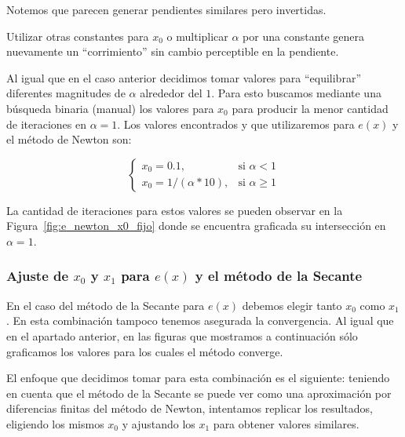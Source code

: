 Notemos que parecen generar pendientes similares pero invertidas.

Utilizar otras constantes para $x_0$ o multiplicar $\alpha$ por una constante
genera nuevamente un ``corrimiento'' sin cambio perceptible en la pendiente.

Al igual que en el caso anterior decidimos tomar valores para ``equilibrar''
diferentes magnitudes de $\alpha$ alrededor del $1$. Para esto buscamos
mediante una búsqueda binaria (manual) los valores para $x_0$ para producir la
menor cantidad de iteraciones en $\alpha = 1$. Los valores encontrados y que
utilizaremos para $e(x)$ y el método de Newton son:

\[
\begin{cases}
x_0 = 0.1, & \mbox{si } \alpha < 1\\
x_0 = 1 / (\alpha * 10), & \mbox{si } \alpha \ge 1
\end{cases}
\]

La cantidad de iteraciones para estos valores se pueden observar en la
Figura~\ref{fig:e_newton_x0_fijo} donde se encuentra graficada su intersección
en $\alpha = 1$.

\subsubsection{Ajuste de $x_0$ y $x_1$ para $e(x)$ y el método de la Secante}
\label{ssub:ajuste_e_x0_x1_secante}

En el caso del método de la Secante para $e(x)$ debemos elegir tanto $x_0$ como
$x_1$. En esta combinación tampoco tenemos asegurada la convergencia. Al igual
que en el apartado anterior, en las figuras que mostramos a continuación sólo
graficamos los valores para los cuales el método converge.

El enfoque que decidimos tomar para esta combinación es el siguiente: teniendo
en cuenta que el método de la Secante se puede ver como una aproximación por
diferencias finitas del método de Newton, intentamos replicar los resultados,
eligiendo los mismos $x_0$ y ajustando los $x_1$ para obtener valores
similares.

